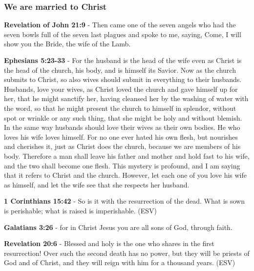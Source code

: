 \documentclass[11pt]{article}
\begin{document}
\subsubsection{We are married to Christ}
\label{sec:org34bc5c4}
\textbf{Revelation of John 21:9} - Then came one of the seven angels who had the seven bowls full of the seven last plagues and spoke to me, saying, Come, I will show you the Bride, the wife of the Lamb.

\textbf{Ephesians 5:23-33} - For the husband is the head of the wife even as Christ is the head of the church, his body, and is himself its Savior. Now as the church submits to Christ, so also wives should submit in everything to their husbands. Husbands, love your wives, as Christ loved the church and gave himself up for her, that he might sanctify her, having cleansed her by the washing of water with the word, so that he might present the church to himself in splendor, without spot or wrinkle or any such thing, that she might be holy and without blemish. In the same way husbands should love their wives as their own bodies. He who loves his wife loves himself. For no one ever hated his own flesh, but nourishes and cherishes it, just as Christ does the church, because we are members of his body. Therefore a man shall leave his father and mother and hold fast to his wife, and the two shall become one flesh. This mystery is profound, and I am saying that it refers to Christ and the church. However, let each one of you love his wife as himself, and let the wife see that she respects her husband.

\textbf{1 Corinthians 15:42} -  So is it with the resurrection of the dead.  What is sown is perishable; what is raised is imperishable. (ESV)

\textbf{Galatians 3:26} - for in Christ Jesus you are all sons of God, through faith.

\textbf{Revelation 20:6} - Blessed and holy is the one who shares in the first resurrection! Over such the second death has no power, but they will be priests of God and of Christ, and they will reign with him for a thousand years. (ESV)
\end{document}
